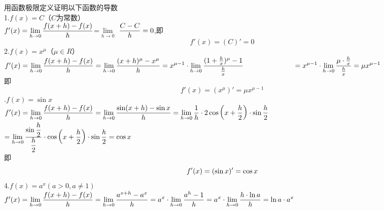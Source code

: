 \texample[用函数极限定义证明以下函数的导数] \sj
\examples 用函数极限定义证明以下函数的导数\vspace{0.8em} \\
1.\enspace$f(x)=C$（$C$为常数）\vspace{0.8em}\\ 
\solve $f'(x)=\lim\limits_{h\to 0}\displaystyle \frac{f(x+h)-f(x)}{h}$=$\lim\limits_{h\to 0}$ $\displaystyle\frac{C-C}{h}=0$,即
\vspace*{-0.5em}
\begin{equation}
	\nonumber
	f'(x)=(C)'=0
\end{equation}
2.\enspace$f(x)=x^{\mu}$（$\mu \in R$）
\vspace{0.8em} \\ \solve $f'(x)=\lim\limits_{h\to 0} \displaystyle\frac{f(x+h)-f(x)}{h}=\lim\limits_{h\to 0}\displaystyle\frac{(x+h)^{\mu}-x^\mu}{h}=x^{\mu-1}\cdot \lim\limits_{h\to 0}\frac{(1+\frac{h}{x})^\mu-1}{\frac{h}{x}}\\
\hspace*{7em}=x^{\mu-1}\cdot\lim\limits_{h\to 0}\frac{\textstyle \mu\cdot\frac{h}{x}}{\textstyle \frac{h}{x}}=\mu x^{\mu-1}$\vspace{0.8em}\\即
\begin{equation}
	\nonumber
	f'(x)=(x^\mu)'=\mu x^{\mu-1}
\end{equation}
\newpage                                                                 
.\enspace$f(x)=\sin x$
\vspace{0.8em} \\ \solve $f'(x)=\lim\limits_{h\to 0}\displaystyle\frac{f(x+h)-f(x)}{h}=\lim\limits_{h\to 0}\displaystyle\frac{\sin (x+h)-\sin x}{h}=\lim\limits_{h\to 0}\displaystyle\frac{1}{h}\cdot 2\cos\displaystyle\bigg(x+\frac{h}{2}\bigg)\cdot\sin\displaystyle\frac{h}{2}$\\  
\hspace*{7em} $=\lim\limits_{h\to 0}\frac{\displaystyle\sin\frac{h}{2}}{\displaystyle\frac{h}{2}}\cdot\cos\bigg(x+\displaystyle\frac{h}{2}\bigg)\cdot\displaystyle\sin\frac{h}{2}=\cos x$
\\即
\vspace{0.8em}
\begin{equation}
	\nonumber
	f'(x)=(\sin x)'=\cos x
	\vspace*{0.5em}
\end{equation}
4.\enspace$f(x)=a^x(a>0,a\neq1)$
\vspace{0.8em} \\ \solve
$f'(x)=\lim\limits_{h\to 0}\displaystyle \frac{f(x+h)-f(x)}{h}=\lim\limits_{h\to0}\frac{a^{x+h}-a^x}{h}=a^x\cdot\lim\limits_{h\to0}\frac{a^h-1}{h}=a^x\cdot\lim\limits_{h\to0}\frac{h\cdot \ln a}{h}=\ln a\cdot a^x$\\
